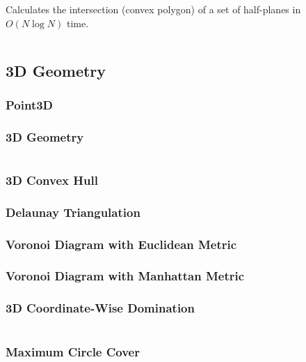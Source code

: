 Calculates the intersection (convex polygon) of a set of half-planes in $O(N \log N)$ time.

\hrulefill \vspace{-\baselineskip}
\begin{multicols}{2}
\inputminted[autogobble,fontsize=\tiny]{C++}{Geometry/half_plane.cpp}
\end{multicols}
\vspace{-\baselineskip}
\noindent \hrulefill

\subsection{3D Geometry}
\subsubsection{Point3D}
\subsubsection{3D Geometry}

\hrulefill \vspace{-\baselineskip}
\begin{multicols}{2}
\inputminted[autogobble,fontsize=\tiny]{C++}{Geometry/3d_geometry.cpp}
\end{multicols}
\vspace{-\baselineskip}
\noindent \hrulefill

\subsubsection{3D Convex Hull}
\subsubsection{Delaunay Triangulation}
\subsubsection{Voronoi Diagram with Euclidean Metric}
\subsubsection{Voronoi Diagram with Manhattan Metric}

\newpage

\subsubsection{3D Coordinate-Wise Domination}

\hrulefill \vspace{-\baselineskip}
\begin{multicols}{2}
\inputminted[autogobble,fontsize=\tiny]{C++}{Geometry/3d_coord_domination.cpp}
\end{multicols}
\vspace{-\baselineskip}
\noindent \hrulefill

\subsubsection{Maximum Circle Cover}